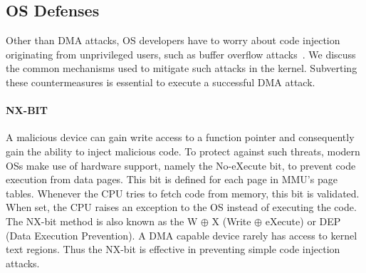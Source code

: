 




\subsection{OS Defenses}

Other than DMA attacks, OS developers have to worry about code injection originating from unprivileged users, such as buffer overflow attacks~\cite{nx, kalsr}.
We discuss the common mechanisms used to mitigate such attacks in the kernel. Subverting these countermeasures is essential to execute a successful DMA attack.

\paragraph{NX-BIT}\label{sec:nx-bit}

A malicious device can gain write access to a function pointer and consequently gain the ability to inject malicious code. 
To protect against such threats, modern OSs make use of hardware support, namely the No-eXecute bit, to prevent code execution from data pages. This bit is defined for each page in MMU’s page tables. Whenever the CPU tries to fetch code from memory, this bit is validated. When set, the CPU raises an exception to the OS instead of executing the code. The NX-bit method is also known as the W $\oplus$ X (Write $\oplus$ eXecute) or DEP (Data Execution Prevention). 
A DMA capable device rarely has access to kernel text regions. Thus the NX-bit is effective in preventing simple code injection attacks.

